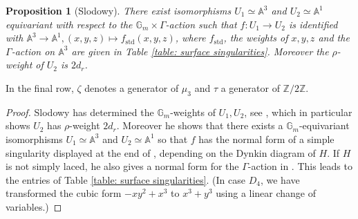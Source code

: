 \documentclass{article} %
\newtheorem{proposition}{Proposition}[section]
\numberwithin{equation}{section}
\theoremstyle{definition}
\newcommand{\G}{\mathbb{G}}
\newcommand{\A}{\mathbb{A}}
\newcommand{\Z}{\mathbb{Z}}
\begin{document}
\begin{proposition}[Slodowy]\label{prop: normal form surface singularity}
    There exist isomorphisms $U_1\simeq \A^3$ and $U_2\simeq \A^1$ equivariant with respect to the $\G_m \times \Gamma$-action such that $f\colon U_1\rightarrow U_2$ is identified with $\A^3\rightarrow \A^1, (x,y,z)\mapsto f_{\mathrm{std}}(x,y,z)$, where $f_{\mathrm{std}}$, the weights of $x,y,z$ and the $\Gamma$-action on $\A^3$ are given in Table \ref{table: surface singularities}.
    Moreover the $\rho$-weight of $U_2$ is $2d_r$.
\end{proposition}


In the final row, $\zeta$ denotes a generator of $\mu_3$ and $\tau$ a generator of $\Z/2\Z$.
\begin{proof}
    Slodowy has determined the $\G_m$-weights of $U_1,U_2$, see \cite[Section 7.4, Proposition 2 and Section 8.2]{Slodowy-simplesingularitiesalggroups}, which in particular shows $U_2$ has $\rho$-weight $2d_r$.
    Moreover he shows \cite[Section 8.3, Proposition 2]{Slodowy-simplesingularitiesalggroups} that there exists a $\G_m$-equivariant isomorphisms $U_1\simeq \A^3$ and $U_2\simeq \A^1$ so that $f$ has the normal form of a simple singularity displayed at the end of \cite[Section 8.2]{Slodowy-simplesingularitiesalggroups}, depending on the Dynkin diagram of $H$.
    If $H$ is not simply laced, he also gives a normal form for the $\Gamma$-action in \cite[Section 8.4]{Slodowy-simplesingularitiesalggroups}.
    This leads to the entries of Table \ref{table: surface singularities}.
    (In case $D_4$, we have transformed the cubic form $-xy^2 + x^3$ to $x^3 +y^3$ using a linear change of variables.)
\end{proof}




\begingroup
\end{document}
